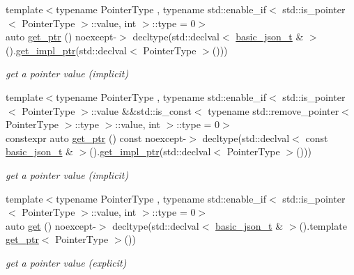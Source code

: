 \begin{DoxyCompactItemize}
\item 
{\footnotesize template$<$typename Pointer\+Type , typename std\+::enable\+\_\+if$<$ std\+::is\+\_\+pointer$<$ Pointer\+Type $>$\+::value, int $>$\+::type  = 0$>$ }\\auto \hyperlink{classnlohmann_1_1basic__json_ae5aa126de247d34c5b4395836d05f044}{get\+\_\+ptr} () noexcept-\/$>$ decltype(std\+::declval$<$ \hyperlink{classnlohmann_1_1basic__json_a125c0afa5f3599949b0589ef7b4aa322}{basic\+\_\+json\+\_\+t} \& $>$().\hyperlink{classnlohmann_1_1basic__json_a8b71cea6588f74f6eab6cc27ae314e5c}{get\+\_\+impl\+\_\+ptr}(std\+::declval$<$ Pointer\+Type $>$()))
\begin{DoxyCompactList}\small\item\em get a pointer value (implicit) \end{DoxyCompactList}\item 
{\footnotesize template$<$typename Pointer\+Type , typename std\+::enable\+\_\+if$<$ std\+::is\+\_\+pointer$<$ Pointer\+Type $>$\+::value \&\&std\+::is\+\_\+const$<$ typename std\+::remove\+\_\+pointer$<$ Pointer\+Type $>$\+::type $>$\+::value, int $>$\+::type  = 0$>$ }\\constexpr auto \hyperlink{classnlohmann_1_1basic__json_aaeeade105f47dd117a29ce42e9ffdeb4}{get\+\_\+ptr} () const noexcept-\/$>$ decltype(std\+::declval$<$ const \hyperlink{classnlohmann_1_1basic__json_a125c0afa5f3599949b0589ef7b4aa322}{basic\+\_\+json\+\_\+t} \& $>$().\hyperlink{classnlohmann_1_1basic__json_a8b71cea6588f74f6eab6cc27ae314e5c}{get\+\_\+impl\+\_\+ptr}(std\+::declval$<$ Pointer\+Type $>$()))
\begin{DoxyCompactList}\small\item\em get a pointer value (implicit) \end{DoxyCompactList}\item 
{\footnotesize template$<$typename Pointer\+Type , typename std\+::enable\+\_\+if$<$ std\+::is\+\_\+pointer$<$ Pointer\+Type $>$\+::value, int $>$\+::type  = 0$>$ }\\auto \hyperlink{classnlohmann_1_1basic__json_a0abaaafcd682381ac410022e4687805d}{get} () noexcept-\/$>$ decltype(std\+::declval$<$ \hyperlink{classnlohmann_1_1basic__json_a125c0afa5f3599949b0589ef7b4aa322}{basic\+\_\+json\+\_\+t} \& $>$().template \hyperlink{classnlohmann_1_1basic__json_ae5aa126de247d34c5b4395836d05f044}{get\+\_\+ptr}$<$ Pointer\+Type $>$())
\begin{DoxyCompactList}\small\item\em get a pointer value (explicit) \end{DoxyCompactList}\item 

\end{DoxyCompactItemize}
